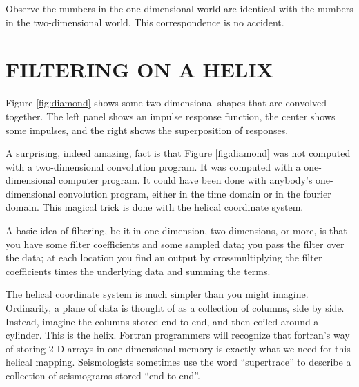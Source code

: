 
\par\noindent
Observe the numbers in the one-dimensional world are identical
with the numbers in the two-dimensional world.
This correspondence is no accident.


\section{FILTERING ON A HELIX}
Figure \ref{fig:diamond} shows some two-dimensional shapes
that are convolved together.
The left panel shows an impulse response function,
the center shows some impulses,
and the right shows the superposition of responses.

\par
A surprising, indeed amazing, fact is that
Figure \ref{fig:diamond} was not computed with a two-dimensional
convolution program.
It was computed with a one-dimensional computer program.
It could have been done with anybody's one-dimensional convolution program,
either in the time domain or in the fourier domain.
This magical trick is done with the helical coordinate system.

\par
A basic idea of filtering, be it in one dimension, two dimensions, or more,
is that you have some filter coefficients and some sampled data;
you pass the filter over the data; 
at each location you find an output by crossmultiplying
the filter coefficients times the underlying data and summing the terms.

\par
The helical coordinate system is much simpler than you might imagine.
Ordinarily, a plane of data is thought of as a collection of columns,
side by side.
Instead, imagine the columns stored end-to-end,
and then coiled around a cylinder.
This is the helix.
Fortran programmers will recognize that fortran's way
of storing 2-D arrays in one-dimensional memory
is exactly what we need for this helical mapping.
Seismologists sometimes use the word ``supertrace''
to describe a collection of seismograms stored ``end-to-end''.

